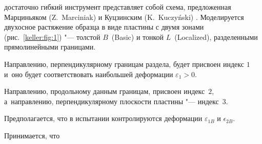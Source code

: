 достаточно гибкий инструмент представляет собой схема, предложенная Марциньяком (Z.~Marciniak) и Куцзинским (K.~Kuczy\'nski) \cite{keller:bib:marc}. Моделируется двухосное растяжение образца в виде пластины с двумя зонами (рис.~\ref{keller:fig:1}) "--- толстой $B$~(Basic) и тонкой $L$~(Localized), разделенными прямолинейными границами. 

Направлению, перпендикулярному границам раздела, будет присвоен индекс $1$ и~оно будет соответствовать наибольшей деформации $\varepsilon_1>0.$  

Направлению, продольному данным границам, присвоен индекс~$2$, а~направлению, перпендикулярному плоскости пластины "--- индекс~$3$. 



Предполагается, что в испытании контролируются деформации $\varepsilon_{1B}$ и $\epsilon_{2B}.$ 

Принимается, что 

